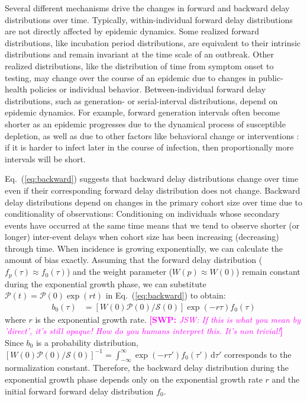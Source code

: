 \documentclass[12pt]{article}
\newcommand{\comment}{\showcomment}
\newcommand{\showcomment}[3]{\textcolor{#1}{\textbf{[#2: }\textsl{#3}\textbf{]}}}
\newcommand{\swp}[1]{\comment{magenta}{SWP}{#1}}
\newcommand{\eref}[1]{Eq.~(\ref{eq:#1})}
\newcommand{\dd}[1]{\ensuremath{\, \mathrm{d}#1}}
\newcommand{\dtau}{\dd{\tau}}
\newcommand{\psymp}{\ensuremath{p}} %
\newcommand{\psize}{{\mathcal P}} %
\newcommand{\ssize}{{\mathcal S}} %
\begin{document}
Several different mechanisms drive the changes in forward and backward delay distributions over time.
Typically, within-individual forward delay distributions are not directly affected by epidemic dynamics.
Some realized forward distributions, like incubation period distributions, are equivalent to their intrinsic distributions and remain invariant at the time scale of an outbreak.
Other realized distributions, like the distribution of time from symptom onset to testing, may change over the course of an epidemic due to changes in public-health policies or individual behavior.
Between-individual forward delay distributions, such as generation- or serial-interval distributions, depend on epidemic dynamics.
For example, forward generation intervals often become shorter as an epidemic progresses due to the dynamical process of susceptible depletion, as well as due to other factors like behavioral change or interventions \citep{kenah2008generation, nishiura2010time, champredon2015intrinsic}: if it is harder to infect later in the course of infection, then proportionally more intervals will be short.

\eref{backward} suggests that backward delay distributions change over time even if their corresponding forward delay distribution does not change.
Backward delay distributions depend on changes in the primary cohort size over time due to conditionality of observations:
Conditioning on individuals whose secondary events have occurred at the same time means that we tend to observe shorter (or longer) inter-event delays when cohort size has been increasing (decreasing) through time.
When incidence is growing exponentially, we can calculate the amount of bias exactly.
Assuming that the forward delay distribution ($f_\psymp(\tau) \approx f_0(\tau)$) and the weight parameter ($W(\psymp) \approx W(0)$) remain constant during the exponential growth phase, we can substitute $\psize(t) = \psize(0) \exp(rt)$ in \eref{backward} to obtain:
\begin{align}
b_0(\tau) &= \left[ W(0) \psize(0)/\ssize(0)\right] \exp(-r\tau) f_0(\tau)
\label{eq:backexp}
\end{align}
where $r$ is the exponential growth rate.
\swp{JSW: If this is what you mean by 'direct', it's still opaque!  How do you humans interpret this.  It's non trivial!}
Since $b_0$ is a probability distribution, $\left[W(0) \psize(0)/\ssize(0)\right]^{-1} = \int_{-\infty}^{\infty} \exp(-r\tau') f_0(\tau') \dtau'$ corresponds to the normalization constant.
Therefore, the backward delay distribution during the exponential growth phase depends only on the exponential growth rate $r$ and the initial forward forward delay distribution $f_0$.
\end{document}

